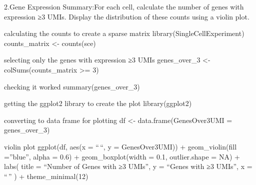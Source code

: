 \documentclass[
  ignorenonframetext,
]{beamer}
\begin{document}
\begin{frame}{2.Gene Expression Summary:For each cell, calculate the
number of genes with expression ≥3 UMIs. Display the distribution of
these counts using a violin plot.}
\label{gene-expression-summaryfor-each-cell-calculate-the-number-of-genes-with-expression-3-umis.-display-the-distribution-of-these-counts-using-a-violin-plot.}
\begin{block}{calculating the counts to create a sparse matrix}
\label{calculating-the-counts-to-create-a-sparse-matrix}
library(SingleCellExperiment) counts\_matrix \textless- counts(sce)
\end{block}

\begin{block}{selecting only the genes with expression ≥3 UMIs}
\label{selecting-only-the-genes-with-expression-3-umis}
genes\_over\_3 \textless-colSums(counts\_matrix \textgreater= 3)
\end{block}

\begin{block}{checking it worked}
\label{checking-it-worked}
summary(genes\_over\_3)
\end{block}

\begin{block}{getting the ggplot2 library to create the plot}
\label{getting-the-ggplot2-library-to-create-the-plot}
library(ggplot2)
\end{block}

\begin{block}{converting to data frame for plotting}
\label{converting-to-data-frame-for-plotting}
df \textless- data.frame(GenesOver3UMI = genes\_over\_3)
\end{block}

\begin{block}{violin plot}
\label{violin-plot}
ggplot(df, aes(x = ``\,``, y = GenesOver3UMI)) + geom\_violin(fill
=''blue'', alpha = 0.6) + geom\_boxplot(width = 0.1, outlier.shape = NA)
+ labs( title = ``Number of Genes with ≥3 UMIs'', y = ``Genes with ≥3
UMIs'', x = ``\,'' ) + theme\_minimal(12)


\end{block}
\end{frame}
\end{document}

